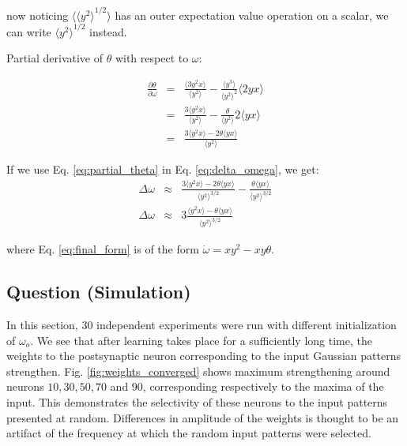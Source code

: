 now noticing $\langle {\langle y^2 \rangle}^{1/2} \rangle$ has an outer expectation value operation on a scalar, we can write $ {\langle y^2 \rangle}^{1/2} $ instead.

Partial derivative of $\theta$ with respect to $\omega$:

\begin{eqnarray}
\frac{\partial \theta}{\partial \omega} &=& \frac{\langle 3y^2 x\rangle}{\langle y^2 \rangle}  - \frac{\langle y^3\rangle}{\langle y^2\rangle^2} \langle 2yx\rangle \\
 &=& \frac{3\langle y^2 x\rangle}{\langle y^2 \rangle}  - \frac{\theta}{\langle y^2\rangle} 2\langle yx\rangle \\
 &=& \frac{3\langle y^2 x\rangle-2\theta\langle yx\rangle}{\langle y^2 \rangle}  \label{eq:partial_theta}
\end{eqnarray}

If we use Eq. \ref{eq:partial_theta} in Eq. \ref{eq:delta_omega}, we get: 
\begin{eqnarray}
\Delta \omega&\approx&  \frac{3\langle y^2 x\rangle-2\theta\langle yx\rangle}{\langle y^2 \rangle^{3/2}}   -  \frac{\theta \langle y x \rangle}  {\langle y^2 \rangle^{3/2}} \\
\Delta \omega&\approx&  3\frac{\langle y^2 x\rangle-\theta\langle yx\rangle}{\langle y^2 \rangle^{3/2}}  \label{eq:final_form} 
\end{eqnarray}

where Eq. \ref{eq:final_form} is of the form $\dot\omega =  xy^2 - xy\theta$.
\newpage
\subsection{Question (Simulation)}
In this section, 30 independent experiments were run with different initialization of $\omega_o$. We see that after learning takes place for a sufficiently long time, the weights to the postsynaptic neuron corresponding to the input Gaussian patterns strengthen. Fig. \ref{fig:weights_converged} shows maximum strengthening around neurons $10, 30, 50, 70$ and $ 90$, corresponding respectively to the maxima of the input. This demonstrates the selectivity of these neurons to the input patterns presented at random. Differences in amplitude of the weights is thought to be an artifact of the frequency at which the random input patterns were selected.   



